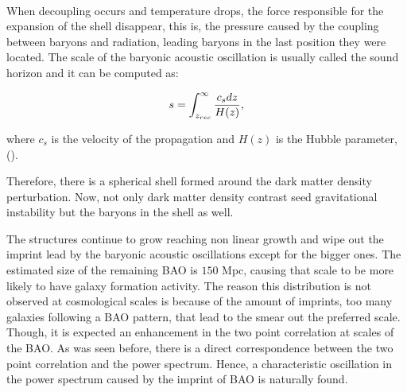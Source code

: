 \

When decoupling occurs and temperature drops, the force responsible for the expansion of the shell disappear, this is, 
the pressure caused by the coupling between baryons and radiation, leading baryons in the last position they were located. 
The scale of the baryonic acoustic oscillation is 
usually called the sound horizon and it can be computed as:

\begin{equation} 
s = \int_{z_{rec}}^{\infty} \frac{c_s dz}{H(z)},
\label{SH}
\end{equation}


where $c_s$ is the velocity of the propagation and $H(z)$ is the Hubble parameter, (\cite{Pilar}). 

Therefore, there is a spherical shell formed 
around the dark matter density perturbation. Now, not only dark matter density contrast seed gravitational instability but the baryons in the shell as well. 

The structures continue to grow reaching non linear growth and wipe out the imprint lead by the baryonic acoustic oscillations except for the bigger ones. The estimated size of the remaining BAO is $150$ Mpc, causing that scale to 
be more likely to have galaxy formation activity. The reason this distribution is not observed at cosmological scales is because of the amount of imprints, too many galaxies following a BAO pattern, that lead to the smear out the preferred scale. Though, it is expected an enhancement in the two point
correlation at scales of the BAO. As was seen before, there is a direct correspondence between the two point correlation and the power spectrum. Hence, a characteristic oscillation in the power spectrum caused by the imprint of BAO is naturally found. 	

